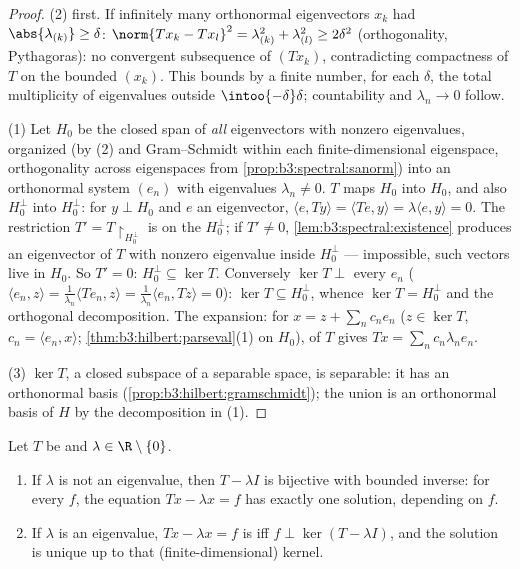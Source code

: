 \begin{proof}
(2) first. If infinitely many orthonormal eigenvectors $x_k$
had $\abs{\lambda_{(k)}} \geq \delta$: $\norm{Tx_k - Tx_l}^2 =
\lambda_{(k)}^2 + \lambda_{(l)}^2 \geq 2\delta^2$
(orthogonality, Pythagoras): no convergent subsequence of
$(Tx_k)$, contradicting compactness of $T$ on the bounded
$(x_k)$. This bounds by a finite number, for each $\delta$,
the total multiplicity of eigenvalues outside
$\intoo{-\delta}\delta$; countability and $\lambda_n \to 0$
follow.

(1) Let $H_0$ be the closed span of \emph{all} eigenvectors
with nonzero eigenvalues, organized (by (2) and
Gram--Schmidt within each finite-dimensional eigenspace,
orthogonality across eigenspaces from
\cref{prop:b3:spectral:sanorm}) into an orthonormal system
$(e_n)$ with eigenvalues $\lambda_n \neq 0$. $T$ maps $H_0$
into $H_0$, and also $H_0^\perp$ into $H_0^\perp$: for $y
\perp H_0$ and $e$ an eigenvector, $\langle e, Ty\rangle =
\langle Te, y\rangle = \lambda\langle e, y\rangle = 0$. The
restriction $T' = T\restriction_{H_0^\perp}$ is 
 on the  $H_0^\perp$; if $T' \neq
0$, \cref{lem:b3:spectral:existence} produces an eigenvector
of $T$ with nonzero eigenvalue inside $H_0^\perp$ ---
impossible, such vectors live in $H_0$. So $T' = 0$:
$H_0^\perp \subseteq \ker T$. Conversely $\ker T \perp$ every
$e_n$ ($\langle e_n, z\rangle = \frac1{\lambda_n}\langle
Te_n, z\rangle = \frac1{\lambda_n}\langle e_n, Tz\rangle =
0$): $\ker T \subseteq H_0^\perp$, whence $\ker T =
H_0^\perp$ and the orthogonal decomposition. The expansion:
for $x = z + \sum_nc_ne_n$ ($z \in \ker T$, $c_n = \langle
e_n, x\rangle$; \cref{thm:b3:hilbert:parseval}(1) on $H_0$),
 of $T$ gives $Tx = \sum_nc_n\lambda_ne_n$.

(3) $\ker T$, a closed subspace of a separable space, is
separable: it has an orthonormal basis
(\cref{prop:b3:hilbert:gramschmidt}); the union is an
orthonormal basis of $H$ by the decomposition in (1).
\end{proof}

\begin{theorem}
\label{thm:b3:spectral:fredholm}
Let $T$ be   and $\lambda \in \R\setminus
\{0\}$.
\begin{enumerate}
  \item If $\lambda$ is not an eigenvalue, then $T - \lambda I$
        is bijective with bounded inverse: for every $f$, the
        equation $Tx - \lambda x = f$ has exactly one
        solution, depending  on $f$.
  \item If $\lambda$ is an eigenvalue, $Tx - \lambda x = f$ is
         iff $f \perp \ker(T - \lambda I)$, and the
        solution is unique up to that (finite-dimensional)
        kernel.
\end{enumerate}
\end{theorem}

